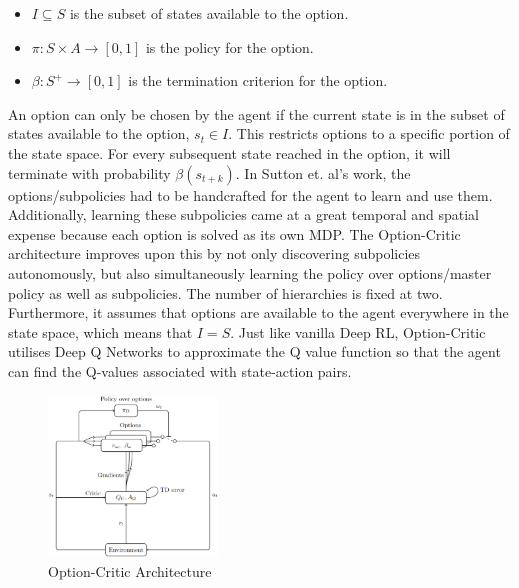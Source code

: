 \documentclass[notitlepage,a4paper,11pt]{article}
\begin{document}
\begin{itemize}[noitemsep]
	\itemsep0em
	\item $I \subseteq S$ is the subset of states available to the option.
	\item $\pi : S \times A \to [0,1]$ is the policy for the option.
	\item $\beta : S^+ \to [0,1]$ is the termination criterion for the option.
\end{itemize}

An option can only be chosen by the agent if the current state is in the subset of states available to the option, $s_t \in I$. This restricts options to a specific portion of the state space. For every subsequent state reached in the option, it will terminate with probability $\beta(s_{t+k})$. In Sutton et. al's work, the options/subpolicies had to be handcrafted for the agent to learn and use them. Additionally, learning these subpolicies came at a great temporal and spatial expense because each option is solved as its own MDP. The Option-Critic architecture \cite{bacon2017option} improves upon this by not only discovering subpolicies autonomously, but also simultaneously learning the policy over options/master policy as well as subpolicies. The number of hierarchies is fixed at two. Furthermore, it assumes that options are available to the agent everywhere in the state space, which means that $I = S$. Just like vanilla Deep RL, Option-Critic utilises Deep Q Networks to approximate the Q value function so that the agent can find the Q-values associated with state-action pairs.



\begin{figure}
	\vspace{-20pt}
	\begin{center}
		\includegraphics[width=0.4\textwidth]{figs/option_critic_architecture.eps}
	\end{center}
	\vspace{-20pt}
\caption{Option-Critic Architecture \protect\cite{ribas2011neural}} \label{fig:4}
\end{figure}
\end{document}
